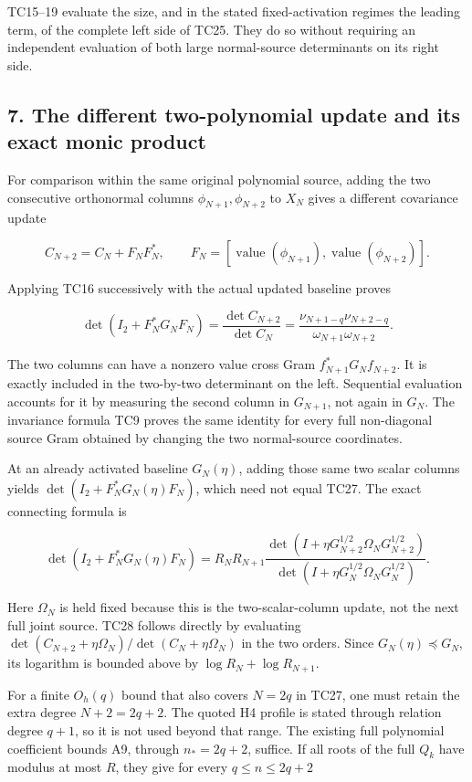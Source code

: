 \documentclass[11pt]{article}
\begin{document}
TC15--19 evaluate the size, and in the stated fixed-activation regimes the leading term, of the complete left side of TC25. They do so without requiring an independent evaluation of both large normal-source determinants on its right side.

\subsection{7. The different two-polynomial update and its exact monic product}\label{the-different-two-polynomial-update-and-its-exact-monic-product}

For comparison within the same original polynomial source, adding the two consecutive orthonormal columns \(\phi_{N+1},\phi_{N+2}\) to \(X_N\) gives a different covariance update

\[
C_{N+2}=C_N+F_NF_N^*,\qquad
F_N=[\operatorname{value}(\phi_{N+1}),\operatorname{value}(\phi_{N+2})].
\tag{TC26}
\]

Applying TC16 successively with the actual updated baseline proves

\[
\boxed{
\det(I_2+F_N^*G_NF_N)
=\frac{\det C_{N+2}}{\det C_N}
=\frac{\nu_{N+1-q}\nu_{N+2-q}}{\omega_{N+1}\omega_{N+2}}.
}
\tag{TC27}
\]

The two columns can have a nonzero value cross Gram \(f_{N+1}^*G_Nf_{N+2}\). It is exactly included in the two-by-two determinant on the left. Sequential evaluation accounts for it by measuring the second column in \(G_{N+1}\), not again in \(G_N\). The invariance formula TC9 proves the same identity for every full non-diagonal source Gram obtained by changing the two normal-source coordinates.

At an already activated baseline \(G_N(\eta)\), adding those same two scalar columns yields \(\det(I_2+F_N^*G_N(\eta)F_N)\), which need not equal TC27. The exact connecting formula is

\[
\det(I_2+F_N^*G_N(\eta)F_N)
=R_NR_{N+1}
\frac{\det(I+\eta G_{N+2}^{1/2}\Omega_NG_{N+2}^{1/2})}
{\det(I+\eta G_N^{1/2}\Omega_NG_N^{1/2})}.
\tag{TC28}
\]

Here \(\Omega_N\) is held fixed because this is the two-scalar-column update, not the next full joint source. TC28 follows directly by evaluating \(\det(C_{N+2}+\eta\Omega_N)/\det(C_N+\eta\Omega_N)\) in the two orders. Since \(G_N(\eta)\preceq G_N\), its logarithm is bounded above by \(\log R_N+\log R_{N+1}\).

For a finite \(O_h(q)\) bound that also covers \(N=2q\) in TC27, one must retain the extra degree \(N+2=2q+2\). The quoted H4 profile is stated through relation degree \(q+1\), so it is not used beyond that range. The existing full polynomial coefficient bounds A9, through \(n_*=2q+2\), suffice. If all roots of the full \(Q_k\) have modulus at most \(R\), they give for every \(q\le n\le2q+2\)
\end{document}
